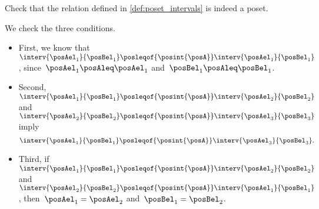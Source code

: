 \begin{exercise}
    Check that the relation defined in \cref{def:poset_intervals} is indeed a poset.
\end{exercise}
\begin{solution}
    We check the three conditions.
    \begin{itemize}
        \item First, we know that~$\interv{\posAel_1}{\posBel_1}\posleqof{\posint{\posA}}\interv{\posAel_1}{\posBel_1}$, since~$\posAel_1\posAleq \posAel_1$ and~$\posBel_1\posAleq \posBel_1$.
        \item Second,~$\interv{\posAel_1}{\posBel_1}\posleqof{\posint{\posA}}\interv{\posAel_2}{\posBel_2}$ and~$\interv{\posAel_2}{\posBel_2}\posleqof{\posint{\posA}}\interv{\posAel_3}{\posBel_3}$ imply
              \begin{equation}
                  \interv{\posAel_1}{\posBel_1}\posleqof{\posint{\posA}}\interv{\posAel_3}{\posBel_3}.
              \end{equation}
        \item Third, if~$\interv{\posAel_1}{\posBel_1}\posleqof{\posint{\posA}}\interv{\posAel_2}{\posBel_2}$ and~$\interv{\posAel_2}{\posBel_2}\posleqof{\posint{\posA}}\interv{\posAel_1}{\posBel_1}$, then~$\posAel_1=\posAel_2$ and~$\posBel_1=\posBel_2$.
    \end{itemize}
\end{solution}
\vfill
\clearpage
